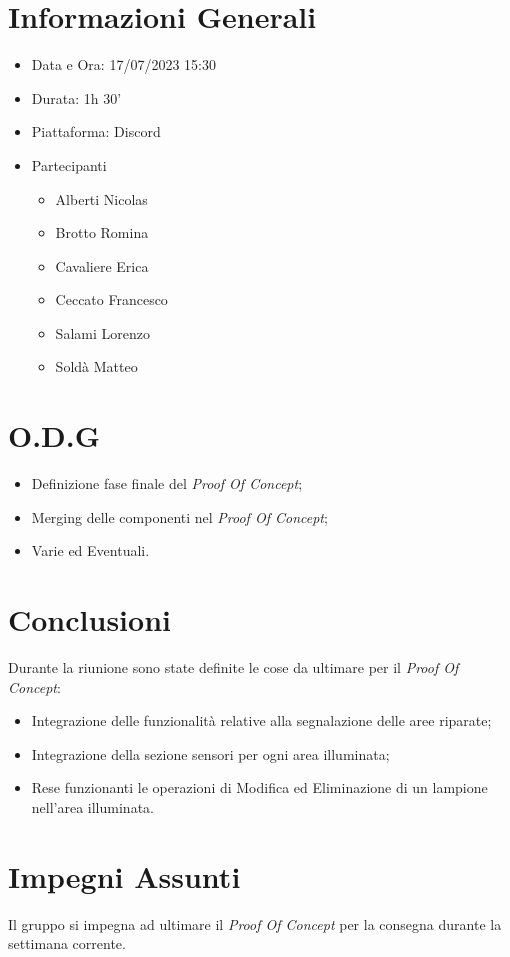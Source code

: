 \documentclass[a4paper, 12pt]{article}
\begin{document}
\makefrontpage

\section*{Informazioni Generali}
\begin{itemize}
    \item Data e Ora: 17/07/2023 15:30
    \item Durata: 1h 30'
    \item Piattaforma: Discord
    \item Partecipanti
    \begin{itemize}
        \item Alberti Nicolas
        \item Brotto Romina
        \item Cavaliere Erica
        \item Ceccato Francesco
        \item Salami Lorenzo
        \item Soldà Matteo
    \end{itemize}
\end{itemize}

\section*{O.D.G}
\begin{itemize}
    \item Definizione fase finale del \textit{Proof Of Concept};
    \item Merging delle componenti nel \textit{Proof Of Concept};
    \item Varie ed Eventuali.
\end{itemize}

\section*{Conclusioni}
Durante la riunione sono state definite le cose da ultimare per il \textit{Proof Of Concept}:
\begin{itemize}
    \item Integrazione delle funzionalità relative alla segnalazione delle aree riparate;
    \item Integrazione della sezione sensori per ogni area illuminata;
    \item Rese funzionanti le operazioni di Modifica ed Eliminazione di un lampione nell'area illuminata.
\end{itemize}

\section*{Impegni Assunti}
Il gruppo si impegna ad ultimare il \textit{Proof Of Concept} per la consegna durante la settimana corrente.
\end{document}
